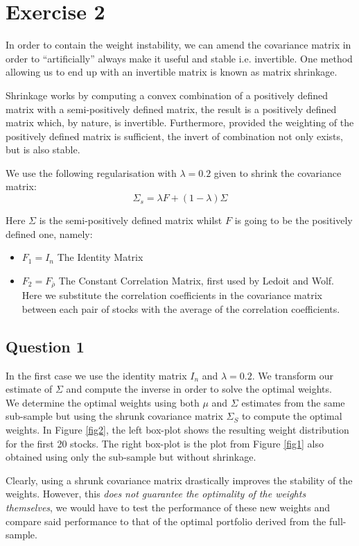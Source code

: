 \chapter*{Exercise 2}

In order to contain the weight instability, we can amend the covariance matrix in order to “artificially” always make it useful and stable i.e. invertible. One method allowing us to end up with an invertible matrix is known as matrix shrinkage. \par\smallskip
Shrinkage works by computing a convex combination of a positively defined matrix with a semi-positively defined matrix, the result is a positively defined matrix which, by nature, is invertible. Furthermore, provided the weighting of the positively defined matrix is sufficient, the invert of combination not only exists, but is also stable. \par\smallskip
We use the following regularisation with $\lambda=0.2$ given to shrink the covariance matrix:
\begin{equation*}
\Sigma_s = \lambda F + (1-\lambda)\Sigma
\end{equation*}

Here $\Sigma$ is the semi-positively defined matrix whilst $F$ is going to be the positively defined one, namely:

\begin{itemize}
    \item $F_1=I_n$ The Identity Matrix
    \item $F_2=F_{\overline{\rho}}$ The Constant Correlation Matrix, first used by Ledoit and Wolf. Here we substitute the correlation coefficients in the covariance matrix between each pair of stocks with the average of the correlation coefficients.
\end{itemize}

\section*{Question 1}

In the first case we use the identity matrix $I_n$ and $\lambda=0.2$. We transform our estimate of $\Sigma$ and compute the inverse in order to solve the optimal weights. \\
We determine the optimal weights using both $\mu$ and $\Sigma$ estimates from the same sub-sample but using the shrunk covariance matrix $\Sigma_S$ to compute the optimal weights. In Figure \ref{fig2}, the left box-plot shows the resulting weight distribution for the first 20 stocks. The right box-plot is the plot from Figure \ref{fig1} also obtained using only the sub-sample but without shrinkage. \par\smallskip
Clearly, using a shrunk covariance matrix drastically improves the stability of the weights. However, this \emph{does not guarantee the optimality of the weights themselves}, we would have to test the performance of these new weights and compare said performance to that of the optimal portfolio derived from the full-sample.

